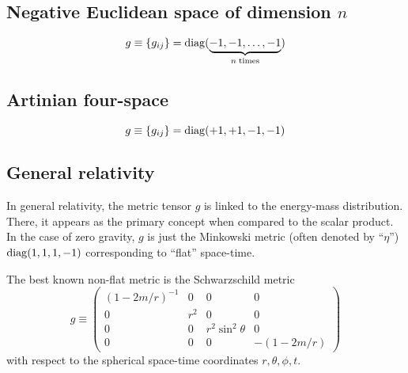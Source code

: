 \subsection*{Negative Euclidean space of dimension $n$}

\begin{equation}
g\equiv \{g_{ij}\}={\rm diag} (\underbrace{-1,-1,\ldots ,-1}_{n\; {\rm times}})
\end{equation}

\subsection*{Artinian four-space}

\begin{equation}
g\equiv \{g_{ij}\}={\rm diag} (+1,+1,-1 ,-1)
\end{equation}



\subsection*{General relativity}

In general relativity, the metric tensor $g$ is linked to the energy-mass distribution.
There, it appears as the primary concept when compared to the scalar product.
In the case of zero gravity, $g$ is just the  Minkowski metric (often denoted by  ``$\eta$'')
${\rm diag} (1,1,1,-1) $ corresponding to ``flat'' space-time.

The best known non-flat metric is the Schwarzschild metric
\begin{equation}
g
\equiv
\begin{pmatrix}
(1-2m/r)^{-1}&0&0&0\\
0&r^2&0&0\\
0&0&r^2\sin^2 \theta &0\\
0&0&0&- \left( 1-{2m/r}\right)
\end{pmatrix}
\end{equation}
with respect to the spherical space-time coordinates $r,\theta ,\phi ,t$.

